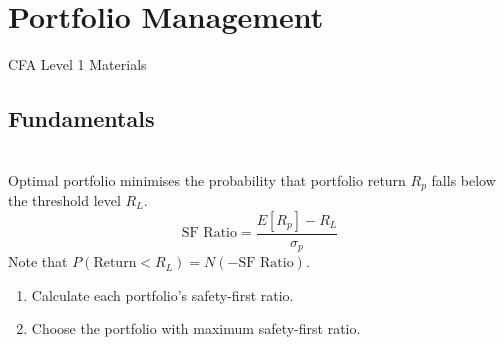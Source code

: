\section{Portfolio Management}

CFA Level 1 Materials

\subsection{Fundamentals}

\begin{definition}  \\
Optimal portfolio minimises the probability that portfolio return $R_p$ falls below the threshold level $R_L$.
\begin{equation}
\text{SF Ratio} = \frac{E[R_p] - R_L}{\sigma_p} \nonumber
\end{equation}
Note that $P(\text{Return} < R_L) = N(-\text{SF Ratio})$.
\begin{enumerate}[label=\roman*.]
\setlength{\itemsep}{0pt}
\item Calculate each portfolio's safety-first ratio.
\item Choose the portfolio with maximum safety-first ratio.
\end{enumerate}
\end{definition}


